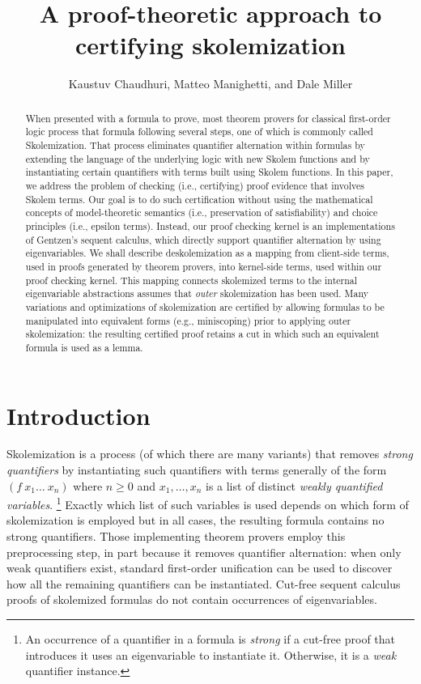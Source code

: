\documentclass[a4paper,USenglish]{lipics-v2018}
\title{A proof-theoretic approach to certifying skolemization}
\author{Kaustuv Chaudhuri, Matteo Manighetti, and Dale Miller}
       {Inria \& LIX, \'Ecole Polytechnique\\{Palaiseau, France}}
       {}
       {}
       {}
\begin{document}
\maketitle

\begin{abstract}
When presented with a formula to prove, most theorem provers for
classical first-order logic process that formula following several
steps, one of which is commonly called Skolemization.
%
That process eliminates quantifier alternation within formulas by
extending the language of the underlying logic with new Skolem
functions and by instantiating certain quantifiers with terms built
using Skolem functions.
%
In this paper, we address the problem of checking (i.e., certifying)
proof evidence that involves Skolem terms.
%
Our goal is to do such certification without using the mathematical
concepts of model-theoretic semantics (i.e., preservation of
satisfiability) and choice principles (i.e., epsilon terms).
%
Instead, our proof checking kernel is an implementations of Gentzen's
sequent calculus, which directly support quantifier alternation by
using eigenvariables.
%
We shall describe deskolemization as a mapping from client-side terms,
used in proofs generated by theorem provers, into kernel-side terms,
used within our proof checking kernel.
%
This mapping connects skolemized terms to the internal eigenvariable
abstractions assumes that \emph{outer} skolemization has been
used.
%
Many variations and optimizations of skolemization are certified by
allowing formulas to be manipulated into equivalent forms (e.g.,
miniscoping) prior to applying outer skolemization: the resulting
certified proof retains a cut in which such an equivalent formula is
used as a lemma.
\end{abstract}

\section{Introduction}
\label{sec:intro}

Skolemization is a process (of which there are many variants) that
removes \emph{strong quantifiers} by instantiating such quantifiers
with terms generally of the form $(f~x_1\ldots~x_n)$ where $n\ge 0$
and $x_1,\ldots, x_n$ is a list of distinct \emph{weakly quantified
  variables}.%
\footnote{An occurrence of a quantifier in a formula is \emph{strong}
  if a cut-free proof that introduces it uses an eigenvariable to
  instantiate it.  Otherwise, it is a \emph{weak} quantifier instance.}
%
Exactly which list of such variables is used depends
on which form of skolemization is employed but in all cases, the
resulting formula contains no strong quantifiers.
%
Those implementing theorem provers employ this preprocessing step, in
part because it removes quantifier alternation: when only weak
quantifiers exist, standard first-order unification can be used to
discover how all the remaining quantifiers can be instantiated.
%
Cut-free sequent calculus proofs of skolemized formulas do not contain
occurrences of eigenvariables.
\end{document}
